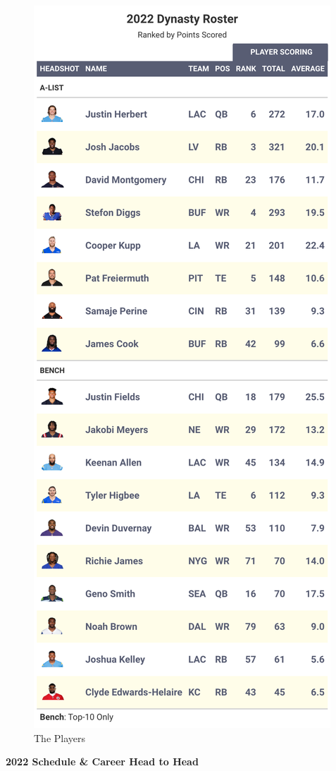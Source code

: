 \documentclass[
]{article}
\begin{document}
\begin{figure}
\includegraphics[width=0.75\linewidth,height=0.75\textheight]{output/2022/dynasty_roster_Zacgeoffray} \caption{The Players}\label{fig:unnamed-chunk-21}
\end{figure}
\newpage

\textbf{2022 Schedule \& Career Head to Head}
\end{document}
